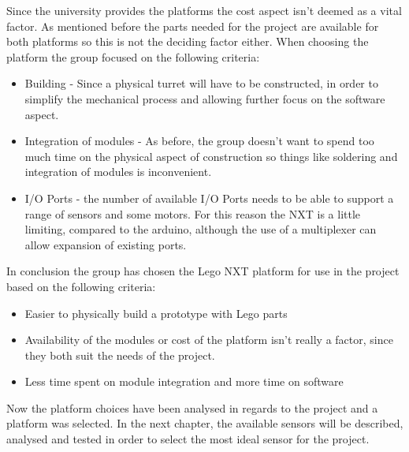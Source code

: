 Since the university provides the platforms the cost aspect isn't deemed as a
vital factor. As mentioned before the parts needed for the project are
available for both platforms so this is not the deciding factor either. When
choosing the platform the group focused on the following criteria:
\begin{itemize}
  \item Building - Since a physical turret will have to be constructed, in
  order to simplify the mechanical process and allowing further focus on the
  software aspect.
  \item Integration of modules - As before, the group doesn't want to spend too
  much time on the physical aspect of construction so things like soldering and
  integration of modules is inconvenient.
  \item I/O Ports - the number of available I/O Ports needs to be able to
  support a range of sensors and some motors. For this reason the NXT is a
  little limiting, compared to the arduino, although the use of a multiplexer
  can allow expansion of existing ports.
\end{itemize}
In conclusion the group has chosen the Lego NXT platform for use in the project
based on the following criteria:
\begin{itemize}
  \item Easier to physically build a prototype with Lego parts
  \item Availability of the modules or cost of the platform isn't really a
  factor, since they both suit the needs of the project.
  \item Less time spent on module integration and more time on software
\end{itemize}

Now the platform choices have been analysed in regards to the project and a
platform was selected. In the next chapter, the available sensors will be
described, analysed and tested in order to select the most ideal sensor for the
project.
